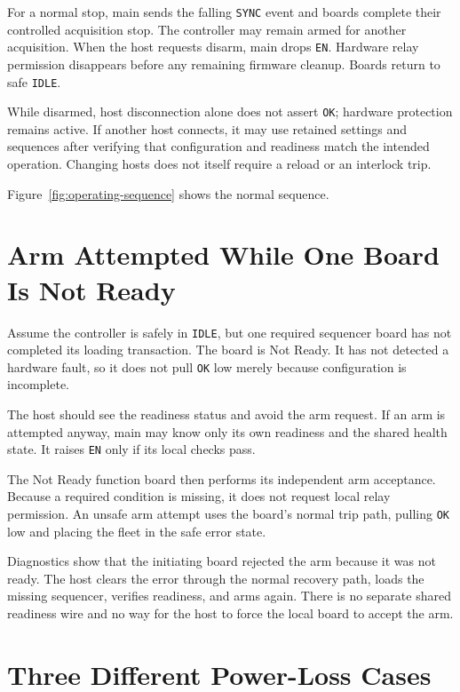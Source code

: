 For a normal stop, main sends the falling \texttt{SYNC} event and boards complete their controlled acquisition stop. The controller may remain armed for another acquisition. When the host requests disarm, main drops \texttt{EN}. Hardware relay permission disappears before any remaining firmware cleanup. Boards return to safe \texttt{IDLE}.

While disarmed, host disconnection alone does not assert \texttt{OK}; hardware protection remains active. If another host connects, it may use retained settings and sequences after verifying that configuration and readiness match the intended operation. Changing hosts does not itself require a reload or an interlock trip.

Figure~\ref{fig:operating-sequence} shows the normal sequence.

\section{Arm Attempted While One Board Is Not Ready}

Assume the controller is safely in \texttt{IDLE}, but one required sequencer board has not completed its loading transaction. The board is Not Ready. It has not detected a hardware fault, so it does not pull \texttt{OK} low merely because configuration is incomplete.

The host should see the readiness status and avoid the arm request. If an arm is attempted anyway, main may know only its own readiness and the shared health state. It raises \texttt{EN} only if its local checks pass.

The Not Ready function board then performs its independent arm acceptance. Because a required condition is missing, it does not request local relay permission. An unsafe arm attempt uses the board's normal trip path, pulling \texttt{OK} low and placing the fleet in the safe error state.

Diagnostics show that the initiating board rejected the arm because it was not ready. The host clears the error through the normal recovery path, loads the missing sequencer, verifies readiness, and arms again. There is no separate shared readiness wire and no way for the host to force the local board to accept the arm.

\section{Three Different Power-Loss Cases}

